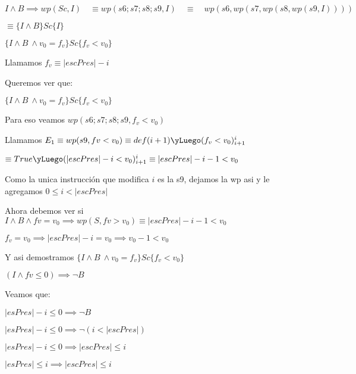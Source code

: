 \documentclass[10pt,a4paper]{article}
\begin{document}
	$ I \wedge B \implies wp(Sc, I) \quad \equiv wp(s6;s7;s8;s9, I)\quad \equiv \quad wp(s6, wp(s7, wp(s8, wp(s9, I))))$
	
	$ \equiv \{I \wedge B\}  Sc  \{I\}$





\vspace{1.2cm}
$ \{I \wedge B\ \wedge v_0 = f_v\}  Sc  \{f_v < v_0\}$

\vspace{0.3cm}
Llamamos $f_v \equiv |escPres| - i$
	
		
\vspace{0.3cm}
Queremos ver que:
		
$ \{I \wedge B\ \wedge v_0 = f_v\}  Sc  \{f_v < v_0\}$

\vspace{0.3cm}
Para eso veamos $wp(s6;s7;s8;s9, f_v < v_0)$

\vspace{0.3cm}
Llamamos $E_1 \equiv wp(s9, fv < v_0) \equiv def(i + 1) \yLuego (f_v < v_0)^{i}_{i+1}$

$\equiv True \yLuego (|escPres| - i < v_0 )^{i}_{i+1} \equiv |escPres| - i - 1 < v_0$

\vspace{0.3cm}
Como la unica instrucción que modifica $i$ es la s9, dejamos la wp asi y le agregamos $0 \leq i < |escPres|$

\vspace{0.3cm}
    Ahora debemos ver si $I \wedge B \wedge fv = v_0 \implies wp(S, fv > v_0) \equiv |escPres| - i - 1 < v_0$

	\vspace{0.3cm}
    $f_v = v_0 \implies |escPres| - i = v_0 \implies v_0 - 1 < v_0$

	\vspace{0.3cm}
	Y asi demostramos $ \{I \wedge B\ \wedge v_0 = f_v\}  Sc  \{f_v < v_0\}$

\pagebreak

$(I \wedge fv \leq 0 ) \implies \neg B$

\vspace{0.3cm}
Veamos que:

\vspace{0.3cm}
$|esPres| - i \leq 0 \implies \neg B$

$|esPres| - i \leq 0 \implies \neg (i < |escPres|)$

$|esPres| - i \leq 0 \implies |escPres| \leq i $

$|esPres| \leq i \implies |escPres| \leq i $
\end{document}
